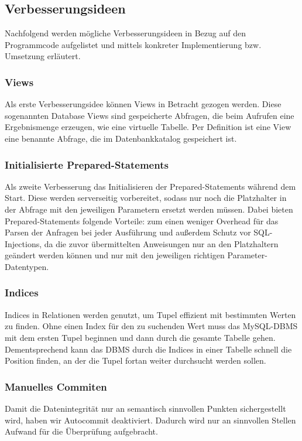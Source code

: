 \subsection{Verbesserungsideen}\label{subsec:verbesserungsideen}
Nachfolgend werden mögliche Verbesserungsideen in Bezug auf den Programmcode aufgelistet und mittels konkreter Implementierung bzw. Umsetzung erläutert.
\subsubsection{Views}
Als erste Verbesserungsidee können Views in Betracht gezogen werden.
Diese sogenannten Database Views sind gespeicherte Abfragen, die beim Aufrufen eine Ergebnismenge erzeugen, wie eine virtuelle Tabelle.
Per Definition ist eine View eine benannte Abfrage, die im Datenbankkatalog gespeichert ist.

\subsubsection{Initialisierte Prepared-Statements}
Als zweite Verbesserung das Initialisieren der Prepared-Statements während dem Start.
Diese werden serverseitig vorbereitet, sodass nur noch die Platzhalter in der Abfrage mit den jeweiligen Parametern ersetzt werden müssen.
Dabei bieten Prepared-Statements folgende Vorteile: zum einen weniger Overhead für das Parsen der Anfragen bei jeder Ausführung und außerdem Schutz vor SQL-Injections, da die zuvor übermittelten Anweisungen nur an den Platzhaltern geändert werden können und nur mit den jeweiligen richtigen Parameter-Datentypen.
\subsubsection{Indices}
Indices in Relationen werden genutzt, um Tupel effizient mit bestimmten Werten zu finden.
Ohne einen Index für den zu suchenden Wert muss das MySQL-DBMS mit dem ersten Tupel beginnen und dann durch die gesamte Tabelle gehen.
Dementsprechend kann das DBMS durch die Indices in einer Tabelle schnell die Position finden, an der die Tupel fortan weiter durchsucht werden sollen.

\subsubsection{Manuelles Commiten}
Damit die Datenintegrität nur an semantisch sinnvollen Punkten sichergestellt wird, haben wir Autocommit deaktiviert.
Dadurch wird nur an sinnvollen Stellen Aufwand für die Überprüfung aufgebracht.

